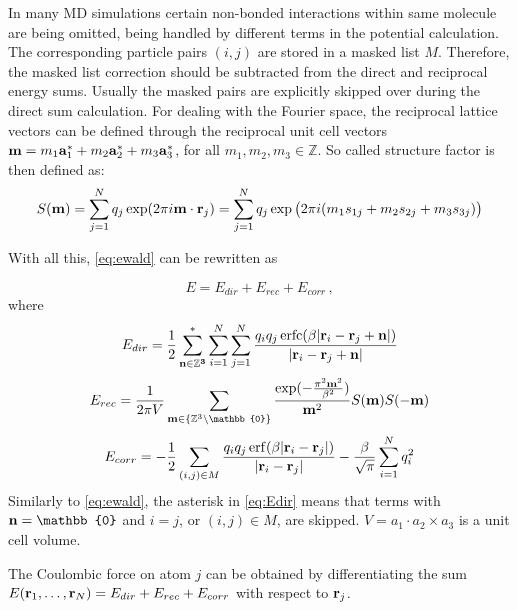 \documentclass[12pt,a4paper]{report}
\newcommand{\draft}[1]{#1}
\DeclareMathOperator\erf{erf}
\DeclareMathOperator\erfc{erfc}
\begin{document}
In many MD simulations certain non-bonded interactions within same molecule are being omitted, being handled by different terms in the potential calculation. The corresponding particle pairs $(i, j)$ are stored in a masked list $M$. Therefore, the masked list correction should be subtracted from the direct and reciprocal energy sums. Usually the masked pairs are explicitly skipped over during the direct sum calculation.	 
For dealing with the Fourier space, the reciprocal lattice vectors can be defined through the reciprocal unit cell vectors $\bold{m} = m_1 \bold{a}_1^* + m_2 \bold{a}_2^* + m_3 \bold{a}_3^*$, for
all $m_1, m_2, m_3 \in \mathbb{Z}$. 
So called structure factor is then defined as:
\begin{equation} \label{eq:Sm}
 S(\bold{m}) = 
\sum\limits_{j=1}^Nq_j \exp(2\pi i\bold{m}\cdot\bold{r}_j)= 
\sum\limits_{j=1}^Nq_j \exp\big(2\pi i(m_1 s_{1j} + m_2 s_{2j}+m_3 s_{3j})\big)
\end{equation}

With all this, \eqref{eq:ewald} can be rewritten as

\[E = E_{dir} + E_{rec} + E_{corr}\,\mathrm{,}\]
where
\begin{equation} \label{eq:Edir}
E_{dir} = \frac{1}{2}\sum\limits_{\bold{n\in \mathbb{Z}^3}}^*\sum\limits_{i=1}^N\sum\limits_{j=1}^N\frac{q_i q_j \erfc(\beta\lvert\bold{r}_i - \bold{r}_j + \bold{n} \rvert)}{\lvert\bold{r}_i - \bold{r}_j + \bold{n} \rvert}
\end{equation}
\begin{equation} \label{eq:Erec}
E_{rec}=\frac{1}{2\pi V}\sum\limits_{\bold{m} \in \{\mathbb{Z}^3 \setminus \mathbb{0}\}}\frac{\exp(-\frac{\pi^2\bold{m}^2}{\beta^2})}{\bold{m}^2}S(\bold{m})S(\bold{-m})
\end{equation}
\[E_{corr} = -\frac{1}{2}\sum\limits_{(i,j)\in M}\frac{q_i q_j \erf(\beta\lvert\bold{r}_i - \bold{r}_j\rvert)}{\lvert\bold{r}_i - \bold{r}_j\rvert} - \frac{\beta}{\sqrt{\pi}}\sum\limits_{i=1}^N q_i^2\]
Similarly to \eqref{eq:ewald}, the asterisk in \eqref{eq:Edir} means that terms with $\bold{n} = \mathbb{0}$ and $i = j$, or $(i,j)\in M$, are skipped.
$V = a_1 \cdot a_2 \times a_3$ is a unit cell volume.

The Coulombic force on atom $j$ can be obtained by differentiating the sum $E(\bold{r}_1, \dotsc, \bold{r}_N) = E_{dir} + E_{rec} + E_{corr}$ with respect to $\bold{r}_j$. 

\end{document}
